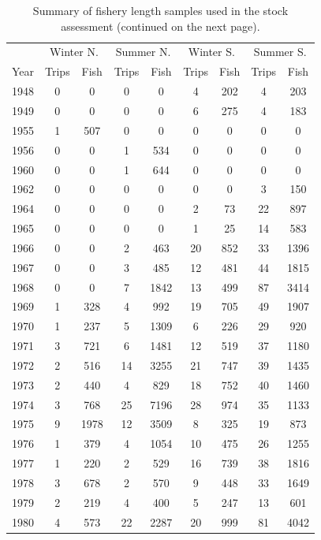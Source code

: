 \documentclass[12pt,]{article}
\begin{document}
\begin{longtable}{ccccccccc}
\caption{Summary of fishery length samples used in the stock assessment (continued on the next page).} \\ 
  \hline
   & \multicolumn{2}{c}{Winter N.} &  \multicolumn{2}{c}{Summer N.} & \multicolumn{2}{c}{Winter S.} & \multicolumn{2}{c}{Summer S.} \\
 Year & Trips & Fish & Trips & Fish & Trips & Fish & Trips & Fish \\
 \hline
1948 & 0 & 0 & 0 & 0 & 4 & 202 & 4 & 203 \\ 
  1949 & 0 & 0 & 0 & 0 & 6 & 275 & 4 & 183 \\ 
  1955 & 1 & 507 & 0 & 0 & 0 & 0 & 0 & 0 \\ 
  1956 & 0 & 0 & 1 & 534 & 0 & 0 & 0 & 0 \\ 
  1960 & 0 & 0 & 1 & 644 & 0 & 0 & 0 & 0 \\ 
  1962 & 0 & 0 & 0 & 0 & 0 & 0 & 3 & 150 \\ 
  1964 & 0 & 0 & 0 & 0 & 2 & 73 & 22 & 897 \\ 
  1965 & 0 & 0 & 0 & 0 & 1 & 25 & 14 & 583 \\ 
  1966 & 0 & 0 & 2 & 463 & 20 & 852 & 33 & 1396 \\ 
  1967 & 0 & 0 & 3 & 485 & 12 & 481 & 44 & 1815 \\ 
  1968 & 0 & 0 & 7 & 1842 & 13 & 499 & 87 & 3414 \\ 
  1969 & 1 & 328 & 4 & 992 & 19 & 705 & 49 & 1907 \\ 
  1970 & 1 & 237 & 5 & 1309 & 6 & 226 & 29 & 920 \\ 
  1971 & 3 & 721 & 6 & 1481 & 12 & 519 & 37 & 1180 \\ 
  1972 & 2 & 516 & 14 & 3255 & 21 & 747 & 39 & 1435 \\ 
  1973 & 2 & 440 & 4 & 829 & 18 & 752 & 40 & 1460 \\ 
  1974 & 3 & 768 & 25 & 7196 & 28 & 974 & 35 & 1133 \\ 
  1975 & 9 & 1978 & 12 & 3509 & 8 & 325 & 19 & 873 \\ 
  1976 & 1 & 379 & 4 & 1054 & 10 & 475 & 26 & 1255 \\ 
  1977 & 1 & 220 & 2 & 529 & 16 & 739 & 38 & 1816 \\ 
  1978 & 3 & 678 & 2 & 570 & 9 & 448 & 33 & 1649 \\ 
  1979 & 2 & 219 & 4 & 400 & 5 & 247 & 13 & 601 \\ 
  1980 & 4 & 573 & 22 & 2287 & 20 & 999 & 81 & 4042 \\ 

\end{longtable}
\end{document}

